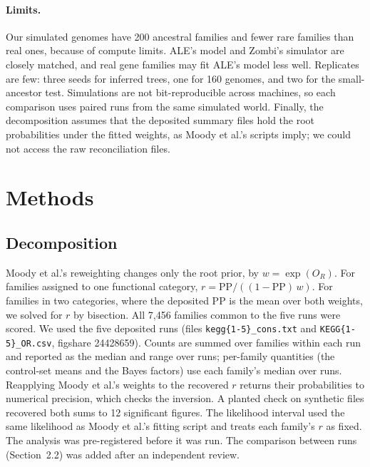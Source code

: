 \documentclass[11pt]{article}
\newcommand{\PP}{\mathrm{PP}}
\begin{document}
\paragraph{Limits.} Our simulated genomes have 200 ancestral families and fewer rare families than real ones, because of compute limits. ALE's model and Zombi's simulator are closely matched, and real gene families may fit ALE's model less well. Replicates are few: three seeds for inferred trees, one for 160 genomes, and two for the small-ancestor test. Simulations are not bit-reproducible across machines, so each comparison uses paired runs from the same simulated world. Finally, the decomposition assumes that the deposited summary files hold the root probabilities under the fitted weights, as Moody et al.'s scripts imply; we could not access the raw reconciliation files.

\section{Methods}

\subsection{Decomposition}
Moody et al.'s reweighting changes only the root prior, by $w = \exp(O_R)$. For families assigned to one functional category, $r = \PP / ((1 - \PP)\,w)$. For families in two categories, where the deposited $\PP$ is the mean over both weights, we solved for $r$ by bisection. All 7,456 families common to the five runs were scored. We used the five deposited runs (files \texttt{kegg\{1-5\}\_cons.txt} and \texttt{KEGG\{1-5\}\_OR.csv}, figshare 24428659). Counts are summed over families within each run and reported as the median and range over runs; per-family quantities (the control-set means and the Bayes factors) use each family's median over runs. Reapplying Moody et al.'s weights to the recovered $r$ returns their probabilities to numerical precision, which checks the inversion. A planted check on synthetic files recovered both sums to 12 significant figures. The likelihood interval used the same likelihood as Moody et al.'s fitting script and treats each family's $r$ as fixed. The analysis was pre-registered before it was run. The comparison between runs (Section~2.2) was added after an independent review.
\end{document}
